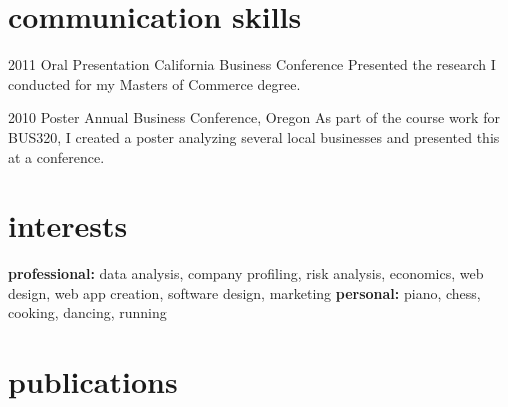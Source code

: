 \documentclass[]{friggeri-cv} %
\begin{document}

\section{communication skills}

\begin{entrylist}


\entry
{2011}
{Oral Presentation}
{California Business Conference}
{Presented the research I conducted for my Masters of Commerce degree.}


\entry
{2010}
{Poster}
{Annual Business Conference, Oregon}
{As part of the course work for BUS320, I created a poster analyzing several local businesses and presented this at a conference.}


\end{entrylist}


\section{interests}

\textbf{professional:} data analysis, company profiling, risk analysis, economics, web design, web app creation, software design, marketing \textbf{personal:} piano, chess, cooking, dancing, running


\section{publications}

\end{document}
